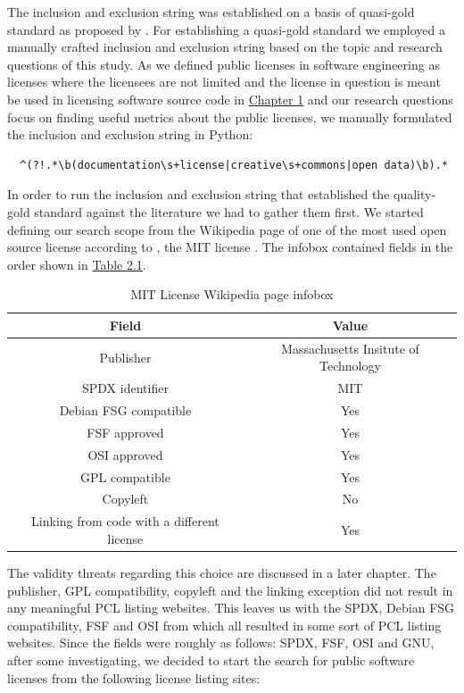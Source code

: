 The inclusion and exclusion string was established on a basis of quasi-gold standard as proposed by \cite{qgs}. For establishing a quasi-gold standard we employed a manually crafted inclusion and exclusion string based on the topic and research questions of this study. As we defined public licenses in software engineering as licenses where the licensees are not limited and the license in question is meant be used in licensing software source code in \hyperref[intro]{Chapter 1} and our research questions focus on finding useful metrics about the public licenses, we manually formulated the inclusion and exclusion string in Python:
\begin{verbatim}
  ^(?!.*\b(documentation\s+license|creative\s+commons|open data)\b).*
\end{verbatim}
In order to run the inclusion and exclusion string that established the quality-gold standard against the literature we had to gather them first. We started defining our search scope from the Wikipedia page of one of the most used open source license according to \cite{github:licenseusage}, the MIT license \citep{wikipedia:mit}. The infobox contained fields in the order shown in \hyperref[table:infobox]{Table 2.1}.

\begin{table}[t]
	\begin{center}
		\begin{tabular}{||c c||}
			\hline
			Field & Value \\
			\hline
			Publisher & Massachusetts Insitute of Technology \\
			SPDX identifier & MIT \\
			Debian FSG compatible & Yes \\
			FSF approved & Yes \\
			OSI approved & 	Yes \\
			GPL compatible & Yes \\
			Copyleft & No \\
			Linking from code with a different license & Yes \\
			\hline
		\end{tabular}
		\caption{MIT License Wikipedia page infobox}
		\label{table:infobox}
	\end{center}
\end{table}
The validity threats regarding this choice are discussed in a later chapter. The publisher, GPL compatibility, copyleft and the linking exception did not result in any meaningful PCL listing websites. This leaves us with the SPDX, Debian FSG compatibility, FSF and OSI from which all resulted in some sort of PCL listing websites. Since the fields were roughly as follows: SPDX, FSF, OSI and GNU, after some investigating, we decided to start the search for public software licenses from the following license listing sites:

